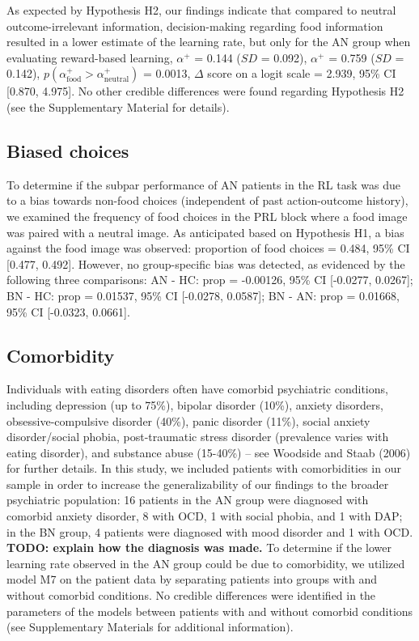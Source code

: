 \documentclass[
  man,floatsintext]{apa6}
\begin{document}
As expected by Hypothesis H2, our findings indicate that compared to neutral outcome-irrelevant information, decision-making regarding food information resulted in a lower estimate of the learning rate, but only for the AN group when evaluating reward-based learning, \(\alpha^+\) = 0.144 (\(SD\) = 0.092), \(\alpha^+\) = 0.759 (\(SD\) = 0.142), \(p(\alpha^+_\text{food} > \alpha^+_\text{neutral})\) = 0.0013, \(\Delta\) score on a logit scale = 2.939, 95\% CI {[}0.870, 4.975{]}. No other credible differences were found regarding Hypothesis H2 (see the Supplementary Material for details).

\hypertarget{biased-choices}{%
\subsection{Biased choices}\label{biased-choices}}

To determine if the subpar performance of AN patients in the RL task was due to a bias towards non-food choices (independent of past action-outcome history), we examined the frequency of food choices in the PRL block where a food image was paired with a neutral image. As anticipated based on Hypothesis H1, a bias against the food image was observed: proportion of food choices = 0.484, 95\% CI {[}0.477, 0.492{]}. However, no group-specific bias was detected, as evidenced by the following three comparisons: AN - HC: prop = -0.00126, 95\% CI {[}-0.0277, 0.0267{]}; BN - HC: prop = 0.01537, 95\% CI {[}-0.0278, 0.0587{]}; BN - AN: prop = 0.01668, 95\% CI {[}-0.0323, 0.0661{]}.

\hypertarget{comorbidity}{%
\subsection{Comorbidity}\label{comorbidity}}

Individuals with eating disorders often have comorbid psychiatric conditions, including depression (up to 75\%), bipolar disorder (10\%), anxiety disorders, obsessive-compulsive disorder (40\%), panic disorder (11\%), social anxiety disorder/social phobia, post-traumatic stress disorder (prevalence varies with eating disorder), and substance abuse (15-40\%) -- see Woodside and Staab (2006) for further details. In this study, we included patients with comorbidities in our sample in order to increase the generalizability of our findings to the broader psychiatric population: 16 patients in the AN group were diagnosed with comorbid anxiety disorder, 8 with OCD, 1 with social phobia, and 1 with DAP; in the BN group, 4 patients were diagnosed with mood disorder and 1 with OCD. \textbf{TODO: explain how the diagnosis was made.} To determine if the lower learning rate observed in the AN group could be due to comorbidity, we utilized model M7 on the patient data by separating patients into groups with and without comorbid conditions. No credible differences were identified in the parameters of the models between patients with and without comorbid conditions (see Supplementary Materials for additional information).
\end{document}
